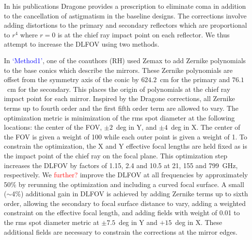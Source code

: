 \documentclass[]{spie}  %
\newcommand{\comr}[1]{\textcolor{red}{#1}}
\newcommand{\comb}[1]{\textcolor{blue}{#1}}
\newcommand{\como}[1]{\textcolor{orange}{#1}}
\begin{document}
In his publications Dragone provides a prescription to eliminate coma
in addition to the cancellation of astigmatism in the baseline designs.\cite{dragone_coma} The corrections 
involve adding distortions to the primary and secondary reflectors 
which are proportional to $r^4$ where $r=0$ is at the chief ray impact point on each reflector. 
We thus attempt to increase the DLFOV using two methods. 

In \comb{ `Method1'}, one of the coauthors (RH) used Zemax to add Zernike 
polynomials to the base conics which describe the mirrors. These Zernike polynomials are offset from the symmetry axis of the conic 
by $624.2$~cm for the primary and $76.1$~cm for the secondary.  
This places the origin of polynomials at the chief ray impact point for each mirror. 
Inspired by the Dragone corrections, all Zernike terms up to fourth order and the first fifth order term are allowed to vary. 
The optimization metric is minimization of the rms spot diameter at 
the following locations: the center of the FOV, $\pm2$~deg in Y, and $\pm4$~deg in X. The center of the FOV is given a weight of 100
while each outer point is given a weight of 1. To constrain the optimization, the X and Y 
effective focal lengths are held fixed as is the impact point of the chief ray on the focal plane. 
This optimization step increases the DLFOV
by factors of 1.15, 2.4 and 10.5 at 21, 155 and 799~GHz, respectively. 
We \comr{further?} improve the DLFOV at all frequencies by approximately 50\% by rerunning the optimization and including 
a curved focal surface. A small ($\sim$4\%) additional gain in DLFOV is achieved by adding Zernike terms 
up to sixth order, allowing the secondary to focal surface distance to vary, adding a weighted constraint on the effective focal length, 
and adding fields with weight of 0.01 to the rms spot diameter metric at $\pm7.5$~deg in Y and $+15$~deg in X. 
These additional fields are necessary to constrain the corrections at the mirror edges.

\end{document}
